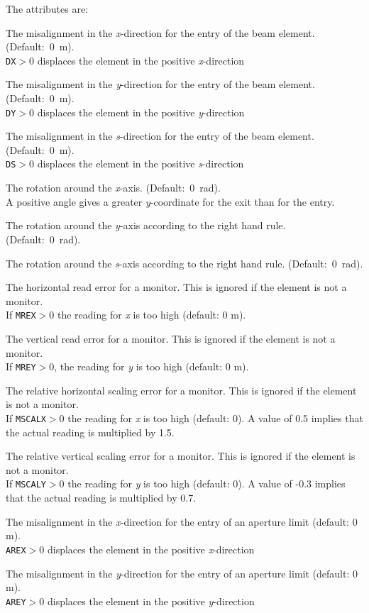 The attributes are: 
\begin{madlist}
   The misalignment in the \textit{x}-direction for the entry of
  the beam element. (Default:~0~m).  \\ 
  \texttt{DX}$>$0 displaces the element in the positive \textit{x}-direction 
  
   The misalignment in the \textit{y}-direction for the entry of
  the beam element. (Default:~0~m). \\
  \texttt{DY}$>$0 displaces the element in the positive \textit{y}-direction 

   The misalignment in the \textit{s}-direction for the entry of
  the beam element. (Default:~0~m). \\
  \texttt{DS}$>$0 displaces the element in the positive \textit{s}-direction 
  
   The rotation around the \textit{x}-axis. (Default:~0~rad). \\ 
  A positive angle gives a greater \textit{y}-coordinate for the exit
  than for the entry. 

   The rotation around the \textit{y}-axis according to the
  right hand rule. (Default:~0~rad).  

   The rotation around the \textit{s}-axis according to the
  right hand rule. (Default:~0~rad).  

   The horizontal read error for a monitor. This is ignored if
  the element is not a monitor. \\
  If \texttt{MREX}$>$0 the reading for \textit{x} is too high (default: 0 m). 

   The vertical read error for a monitor. This is ignored if
  the element is not a monitor. \\  
  If \texttt{MREY}$>$0, the reading for \textit{y} is too high (default: 0 m). 

   The relative horizontal scaling error for a monitor. This
  is ignored if the element is not a monitor. \\ 
  If \texttt{MSCALX}$>$0 the reading for \textit{x} is too high (default: 0). A
  value of 0.5 implies that the actual reading is multiplied by 1.5.  

   The relative vertical scaling error for a monitor. This is
  ignored if the element is not a monitor. \\  
  If \texttt{MSCALY}$>$0 the reading for \textit{y} is too high (default: 0). A
  value of -0.3 implies that the actual reading is multiplied by 0.7.  

   The misalignment in the \textit{x}-direction for the entry
  of an aperture limit (default: 0 m). \\ 
  \texttt{AREX}$>$0 displaces the element in the positive \textit{x}-direction 

   The misalignment in the \textit{y}-direction for the entry
  of an aperture limit (default: 0 m). \\ 
  \texttt{AREY}$>$0 displaces the element in the positive \textit{y}-direction 

\end{madlist}

